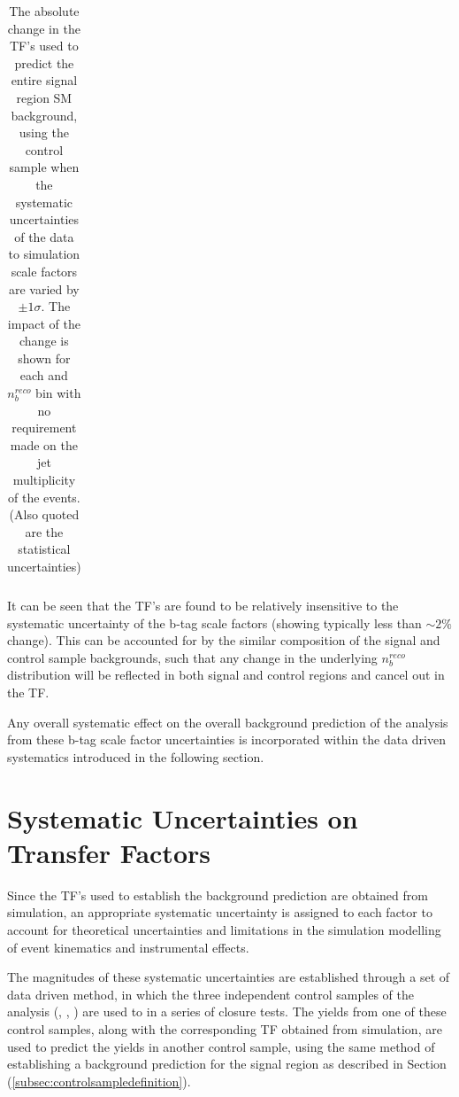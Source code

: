 \begin{table}[ht!]
\begin{center}
\begin{tabular*}{0.95\textwidth}{@{\extracolsep{\fill}} ccccc}
\end{tabular*}
\end{center}
\caption[The absolute change in the \ac{TF}'s used to predict the entire signal region \ac{SM} background, using the \mupjets control sample when the systematic uncertainties of the data to simulation scale factors are varied by $\pm 1 \sigma$.]{The absolute change in the \ac{TF}'s used to predict the entire signal region \ac{SM} background, using the \mupjets control sample when the systematic uncertainties of the data to simulation scale factors are varied by $\pm 1 \sigma$. The impact of the change is shown for each \theht and $n_{b}^{reco}$ bin with no requirement made on the jet multiplicity of the events. (Also quoted are the statistical uncertainties)}\label{tab:btagsfuncertainties}
\end{table}
\def\arraystretch{1.0}

It can be seen that the \ac{TF}'s are found to be relatively insensitive to the systematic uncertainty of the b-tag scale factors (showing typically less than $\sim2\%$ change). This can be accounted for by the similar composition of the signal and control sample backgrounds, such that any change in the underlying $n_{b}^{reco}$ distribution will be reflected in both signal and control regions and cancel out in the \ac{TF}. 

Any overall systematic effect on the overall background prediction of the analysis from these b-tag scale factor uncertainties is incorporated within the data driven systematics introduced in the following section.

\section{Systematic Uncertainties on Transfer Factors}
\label{subsec:sysuncertainties}

Since the \ac{TF}'s used to establish the background prediction are obtained from simulation, an appropriate systematic uncertainty is assigned to each factor to account for theoretical uncertainties \cite{Bern:2011pa} and limitations in the simulation modelling of event kinematics and instrumental effects. 

The magnitudes of these systematic uncertainties are established through a set of data driven method, in which the three independent control samples of the analysis (\mupjets, \dimupjets, \gpjets) are used to in a series of closure tests. The yields from one of these control samples, along with the corresponding \ac{TF} obtained from simulation, are used to predict the yields in another control sample, using the same method of establishing a background prediction for the signal region as described in Section (\ref{subsec:controlsampledefinition}).

